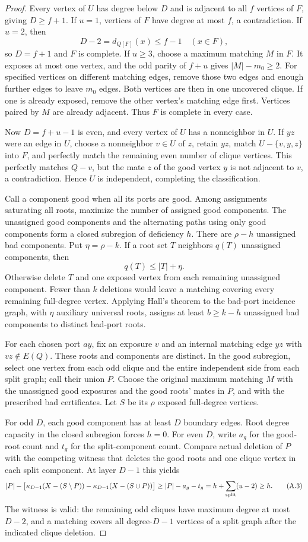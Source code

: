 \documentclass[11pt,a4paper]{article}
\theoremstyle{definition}
\begin{document}
\begin{proof}
Every vertex of $U$ has degree below $D$ and is adjacent to all $f$ vertices of $F$, giving $D\ge f+1$. If $u=1$, vertices of $F$ have degree at most $f$, a contradiction. If $u=2$, then
\[
D-2=d_{Q[F]}(x)\le f-1\quad(x\in F),
\]
so $D=f+1$ and $F$ is complete. If $u\ge3$, choose a maximum matching $M$ in $F$. It exposes at most one vertex, and the odd parity of $f+u$ gives $|M|-m_0\ge2$. For specified vertices on different matching edges, remove those two edges and enough further edges to leave $m_0$ edges. Both vertices are then in one uncovered clique. If one is already exposed, remove the other vertex's matching edge first. Vertices paired by $M$ are already adjacent. Thus $F$ is complete in every case.

Now $D=f+u-1$ is even, and every vertex of $U$ has a nonneighbor in $U$. If $yz$ were an edge in $U$, choose a nonneighbor $v\in U$ of $z$, retain $yz$, match $U-\{v,y,z\}$ into $F$, and perfectly match the remaining even number of clique vertices. This perfectly matches $Q-v$, but the mate $z$ of the good vertex $y$ is not adjacent to $v$, a contradiction. Hence $U$ is independent, completing the classification.

Call a component good when all its ports are good. Among assignments saturating all roots, maximize the number of assigned good components. The unassigned good components and the alternating paths using only good components form a closed subregion of deficiency $h$. There are $\rho-h$ unassigned bad components. Put $\eta=\rho-k$. If a root set $T$ neighbors $q(T)$ unassigned components, then
\[
q(T)\le |T|+\eta. \tag{A.2}
\]
Otherwise delete $T$ and one exposed vertex from each remaining unassigned component. Fewer than $k$ deletions would leave a matching covering every remaining full-degree vertex. Applying Hall's theorem to the bad-port incidence graph, with $\eta$ auxiliary universal roots, assigns at least $b\ge k-h$ unassigned bad components to distinct bad-port roots.

For each chosen port $ay$, fix an exposure $v$ and an internal matching edge $yz$ with $vz\notin E(Q)$. These roots and components are distinct. In the good subregion, select one vertex from each odd clique and the entire independent side from each split graph; call their union $P$. Choose the original maximum matching $M$ with the unassigned good exposures and the good roots' mates in $P$, and with the prescribed bad certificates. Let $S$ be its $\rho$ exposed full-degree vertices.

For odd $D$, each good component has at least $D$ boundary edges. Root degree capacity in the closed subregion forces $h=0$. For even $D$, write $a_g$ for the good-root count and $t_g$ for the split-component count. Compare actual deletion of $P$ with the competing witness that deletes the good roots and one clique vertex in each split component. At layer $D-1$ this yields
\[
 |P|-\bigl[\kappa_{D-1}(X-(S\setminus P))-
 \kappa_{D-1}(X-(S\cup P))\bigr]
 \ge |P|-a_g-t_g
 =h+\sum_{\rm split}(u-2)\ge h. \tag{A.3}
\]
The witness is valid: the remaining odd cliques have maximum degree at most $D-2$, and a matching covers all degree-$D-1$ vertices of a split graph after the indicated clique deletion.


\end{proof}
\end{document}
